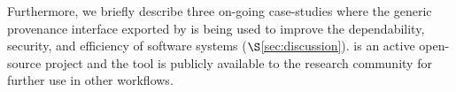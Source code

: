 Furthermore, we briefly describe three on-going case-studies where the generic provenance interface exported by \projecttitle is being used to improve the dependability, security, and efficiency of software systems  ($\S$\ref{sec:discussion}). \projecttitle is an active open-source project and the tool is publicly available to the research community for further use in other workflows.  

